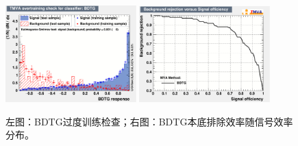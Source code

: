 \begin{figure}[htbp]
\centering
\begin{center}
  \includegraphics[width=0.45\textwidth, keepaspectratio]{fig/OneLepTwoTaus/overtrain_BDTG.pdf}
  \includegraphics[width=0.45\textwidth, keepaspectratio]{fig/OneLepTwoTaus/rejBvsS.pdf}
\end{center}
\caption{左图：BDTG过度训练检查；右图：BDTG本底排除效率随信号效率分布。}
\label{Fig:1l2tau.bdt}
\end{figure}

